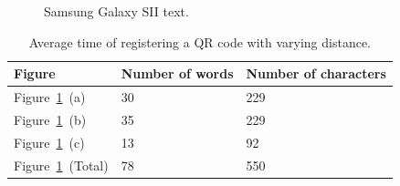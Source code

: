 	\begin{figure}[H]%
		\centering
   		 \qquad
   		 \qquad
   		 \qquad
		\caption{Samsung Galaxy SII text.}
		\label{glassTestTextLengthS2Text}
	\end{figure}

	\begin{table}[ht!]
    		\caption{Average time of registering a QR code with varying distance.} \label{tab:glassTestTextLengthS2TextTable}
		\centering \begin{tabularx}{\textwidth}{l|X|X} \hline
		\textbf{Figure} & \textbf{Number of words} & \textbf{Number of characters} \\ \hline \hline
       
		Figure~\ref{glassTestTextLengthS2Text}~(a)	&30	&229	\\ \hline
		Figure~\ref{glassTestTextLengthS2Text}~(b)	&35	&229	\\ \hline
		Figure~\ref{glassTestTextLengthS2Text}~(c)	&13	&92	\\ \hline
		Figure~\ref{glassTestTextLengthS2Text}~(Total)	&78	&550	\\ \hline
		
		\end{tabularx}
	\end{table}

